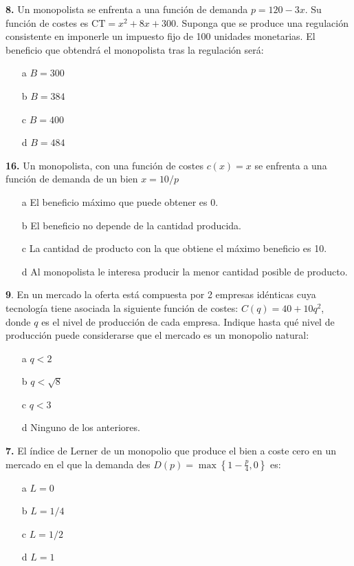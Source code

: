 \documentclass{nuevotema}
\begin{document}


\preguntas

\textbf{8.} Un monopolista se enfrenta a una función de demanda $p=120-3x$. Su función de costes es $\text{CT}=x^2 + 8x + 300$. Suponga que se produce una regulación consistente en imponerle un impuesto fijo de 100 unidades monetarias. El beneficio que obtendrá el monopolista tras la regulación será:

\begin{itemize}
	\item[a] $B=300$
	\item[b] $B=384$
	\item[c] $B=400$
	\item[d] $B=484$
\end{itemize}


\textbf{16.} Un monopolista, con una función de costes $c(x) = x$ se enfrenta a una función de demanda de un bien $x=10/p$
\begin{enumerate}
	\item[a] El beneficio máximo que puede obtener es 0.
	\item[b] El beneficio no depende de la cantidad producida.
	\item[c] La cantidad de producto con la que obtiene el máximo beneficio es 10.
	\item[d] Al monopolista le interesa producir la menor cantidad posible de producto.
\end{enumerate}

\textbf{9}. En un mercado la oferta está compuesta por 2 empresas idénticas cuya tecnología tiene asociada la siguiente función de costes: $C(q) = 40 + 10 q^2$, donde $q$ es el nivel de producción de cada empresa. Indique hasta qué nivel de producción puede considerarse que el mercado es un monopolio natural: 

\begin{enumerate}
	\item[a] $q<2$
	\item[b] $q<\sqrt{8}$
	\item[c] $q < 3$
	\item[d] Ninguno de los anteriores.
\end{enumerate}


\textbf{7.} El índice de Lerner de un monopolio que produce el bien a coste cero en un mercado en el que la demanda des $D(p) = \max \left\lbrace 1 - \frac{p}{4}, 0 \right\rbrace$ es:
\begin{enumerate}
	\item[a] $L = 0$
	\item[b] $L = 1/4$
	\item[c] $L = 1/2$
	\item[d] $L = 1$
\end{enumerate}
\end{document}
